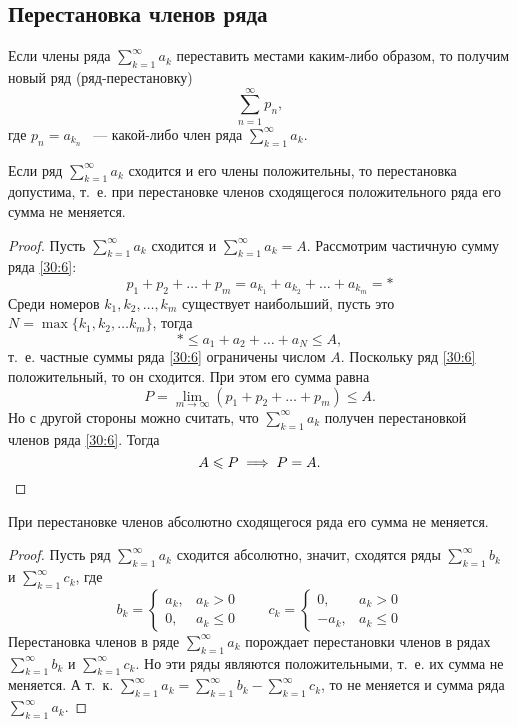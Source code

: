 \documentclass[../../main.tex]{subfiles}
\begin{document}
\subsection{Перестановка членов ряда}
Если члены ряда $\sum\limits_{k = 1}^{\infty} a_k$
переставить местами каким-либо образом, то получим новый ряд (ряд-перестановку)
\begin{equation}
\label{30:6}
\sum\limits_{n = 1}^{\infty} p_n,
\end{equation}
где $p_n = a_{k_n}$ ~--- какой-либо член ряда $\sum\limits_{k = 1}^{\infty} 
a_k$.
\begin{thm}
	Если ряд $\sum\limits_{k = 1}^{\infty} a_k$ сходится и его члены положительны,
	то перестановка допустима, т.~е. при перестановке членов сходящегося
	положительного ряда его сумма не меняется.
\end{thm}
\begin{proof}
	Пусть $\sum\limits_{k = 1}^{\infty} a_k$  сходится и
	$\sum\limits_{k = 1}^{\infty} a_k = A$. Рассмотрим
	частичную сумму ряда \eqref{30:6}:
	\[p_1 + p_2 + \ldots + p_m = a_{k_1} + a_{k_2} + \ldots + a_{k_m} = *\]
	Среди номеров $k_1, k_2, \ldots, k_m$ существует 
	наибольший, пусть это
	$N = \max\{k_1, k_2, \ldots k_m\}$, тогда \[* \leq a_1 + a_2 + \ldots +
	a_N \leq A,\] т.~е. частные суммы ряда \eqref{30:6}
	ограничены числом $A$. Поскольку ряд \eqref{30:6}
	положительный, то он сходится. При этом его сумма равна
	\[P = \lim\limits_{m \to \infty}(p_1 + p_2 + \ldots + p_m) \leq A.\]
	Но с другой стороны можно считать, что $\sum\limits_{k = 1}^{\infty} a_k$
	получен перестановкой членов ряда \eqref{30:6}. Тогда
	\[A \leq P \implies P = A. \qedhere\]
\end{proof}
\begin{crl*}
	При перестановке членов абсолютно сходящегося ряда его сумма не меняется.
\end{crl*}
\begin{proof}
		Пусть ряд $\sum\limits_{k = 1}^{\infty} a_k$ сходится абсолютно,
		значит, сходятся ряды $\sum\limits_{k = 1}^{\infty} b_k$ и
		$\sum\limits_{k = 1}^{\infty} c_k$, где\[b_k = \begin{cases}
			a_k,& a_k > 0\\
			0,& a_k \le 0
		  \end{cases} \qquad
		 c_k = \begin{cases}
			0,& a_k > 0\\
			-a_k,& a_k \le 0
		  \end{cases}\]
  Перестановка членов в ряде $\sum\limits_{k = 1}^{\infty} a_k$ порождает 
  перестановки членов
  в рядах  $\sum\limits_{k = 1}^{\infty} b_k$ и
  $\sum\limits_{k = 1}^{\infty} c_k$. Но эти ряды являются положительными,
  т.~е. их сумма не меняется. А т.~к. $\sum\limits_{k = 1}^{\infty} a_k
   = \sum\limits_{k = 1}^{\infty} b_k - \sum\limits_{k = 1}^{\infty} c_k$,
   то не меняется и сумма ряда $\sum\limits_{k = 1}^{\infty} a_k$.
\end{proof}
\end{document}
